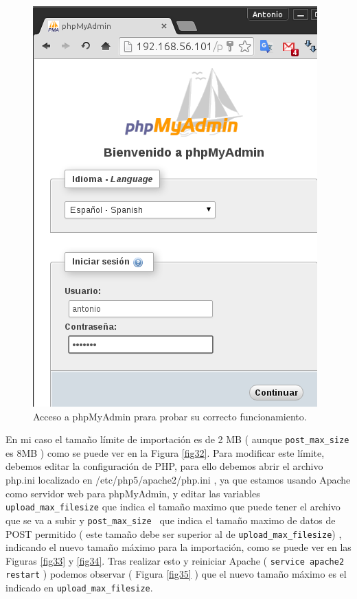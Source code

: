 \begin{figure}[H]
    \begin{center}
        \includegraphics[scale=0.4]{imagenes/img34}
        \caption{Acceso a phpMyAdmin prara probar su correcto funcionamiento.}
        \label{fig31}
    \end{center}
\end{figure}


En mi caso el tamaño límite de importación es de 2 MB ( aunque \texttt{post\_max\_size} es 8MB ) como se puede ver en la Figura \ref{fig32}. Para modificar este límite, debemos editar la configuración de PHP, para ello debemos abrir el archivo php.ini localizado en /etc/php5/apache2/php.ini , ya que estamos usando Apache como servidor web para phpMyAdmin, y editar las variables \texttt{upload\_max\_filesize} que indica el tamaño maximo que puede tener el archivo que se va a subir \cite{php} y  \texttt{post\_max\_size } que indica el tamaño maximo de datos de POST permitido \cite{php1} ( este tamaño debe ser superior al de \texttt{upload\_max\_filesize}) , indicando el nuevo tamaño máximo para la importación, como se puede ver en las Figuras \ref{fig33} y \ref{fig34}. Tras realizar esto y reiniciar Apache ( \texttt{service apache2 restart} ) podemos observar ( Figura \ref{fig35} ) que el nuevo tamaño máximo es el indicado en \texttt{upload\_max\_filesize}.

